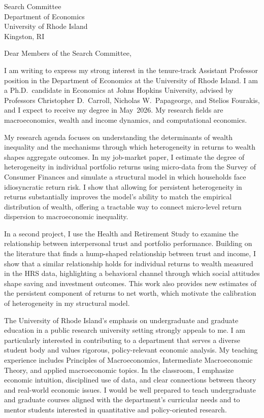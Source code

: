 \documentclass[11pt,letterpaper]{letter}
\begin{document}
\begin{letter}{
Search Committee \\
Department of Economics \\
University of Rhode Island \\
Kingston, RI
}

\opening{Dear Members of the Search Committee,}

I am writing to express my strong interest in the tenure-track Assistant Professor position in the Department of Economics at the University of Rhode Island. I am a Ph.D.\ candidate in Economics at Johns Hopkins University, advised by Professors Christopher D.~Carroll, Nicholas W.~Papageorge, and Stelios Fourakis, and I expect to receive my degree in May~2026. My research fields are macroeconomics, wealth and income dynamics, and computational economics.

My research agenda focuses on understanding the determinants of wealth inequality and the mechanisms through which heterogeneity in returns to wealth shapes aggregate outcomes. In my job-market paper, I estimate the degree of heterogeneity in individual portfolio returns using micro-data from the Survey of Consumer Finances and simulate a structural model in which households face idiosyncratic return risk. I show that allowing for persistent heterogeneity in returns substantially improves the model’s ability to match the empirical distribution of wealth, offering a tractable way to connect micro-level return dispersion to macroeconomic inequality.

In a second project, I use the Health and Retirement Study to examine the relationship between interpersonal trust and portfolio performance. Building on the literature that finds a hump-shaped relationship between trust and income, I show that a similar relationship holds for individual returns to wealth measured in the HRS data, highlighting a behavioral channel through which social attitudes shape saving and investment outcomes. This work also provides new estimates of the persistent component of returns to net worth, which motivate the calibration of heterogeneity in my structural model.

The University of Rhode Island’s emphasis on undergraduate and graduate education in a public research university setting strongly appeals to me. I am particularly interested in contributing to a department that serves a diverse student body and values rigorous, policy-relevant economic analysis. My teaching experience includes Principles of Macroeconomics, Intermediate Macroeconomic Theory, and applied macroeconomic topics. In the classroom, I emphasize economic intuition, disciplined use of data, and clear connections between theory and real-world economic issues. I would be well prepared to teach undergraduate and graduate courses aligned with the department’s curricular needs and to mentor students interested in quantitative and policy-oriented research.


\end{letter}
\end{document}

